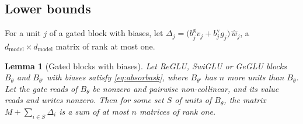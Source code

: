 \documentclass[10pt]{article}
\newtheorem{lemma}[theorem]{Lemma}
\theoremstyle{definition}
\theoremstyle{remark}
\newcommand{\dm}{d_{\mathrm{model}}}
\begin{document}
\subsection{Lower bounds}

For a unit $j$ of a gated block with biases, let $\Delta_j = \big(b^{\mathrm g}_jv_j + b^{\mathrm v}_jg_j\big)\,\hat w_j$, a $\dm\times\dm$ matrix of rank at most one.

\begin{lemma}[Gated blocks with biases]\label{lem:biasgated}
Let ReGLU, SwiGLU or GeGLU blocks $B_\theta$ and $B_{\theta'}$ with biases satisfy \eqref{eq:absorbask}, where $B_{\theta'}$ has $n$ more units than $B_\theta$. Let the gate reads of $B_\theta$ be nonzero and pairwise non-collinear, and its value reads and writes nonzero. Then for some set $S$ of units of $B_\theta$, the matrix $M + \sum_{i\in S}\Delta_i$ is a sum of at most $n$ matrices of rank one.
\end{lemma}
\end{document}
